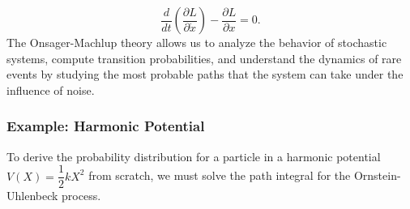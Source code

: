 \documentclass[12pt]{article}
\begin{document}
\begin{singlespace}
\begin{equation}\frac{d}{dt} \left( \frac{\partial L}{\partial \dot{x}} \right) - \frac{\partial L}{\partial x} = 0.
\end{equation}
The Onsager-Machlup theory allows us to analyze the behavior of stochastic systems, compute transition probabilities, and understand the dynamics of rare events by studying the most probable paths that the system can take under the influence of noise.

\subsubsection*{Example: Harmonic Potential}

To derive the probability distribution for a particle in a harmonic potential $V(X) = \dfrac{1}{2}kX^2$ from scratch, we must solve the path integral for the Ornstein-Uhlenbeck process.


\end{singlespace}
\end{document}
